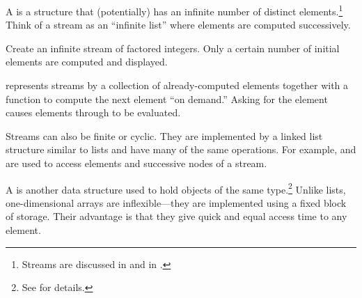 {{{{{{{{A 
is a structure that (potentially) has an infinite number of
distinct elements.\footnote{Streams are discussed in
 and in .}
Think of a stream as an ``infinite list'' where elements are
computed successively.

\begin{xtc}
\begin{xtccomment}
Create an infinite stream of factored integers.
Only a certain number of initial elements are computed
and displayed.
\end{xtccomment}
\begin{spadsrc}
\end{spadsrc}
\begin{TeXOutput}
\begin{fricasmath}{6}
%
\end{fricasmath}
\end{TeXOutput}
\end{xtc}
\begin{xtc}
\begin{xtccomment}
\Language{} represents streams by a collection of already-computed
elements together with a function to compute the next element
``on demand.''
Asking for the  element causes elements  through
 to be evaluated.
\end{xtccomment}
\begin{spadsrc}
\end{spadsrc}
\begin{TeXOutput}
\begin{fricasmath}{7}
\TIMES {}%
\end{fricasmath}
\end{TeXOutput}
\end{xtc}

Streams can also be finite or cyclic.
They are implemented by a linked list structure similar to lists
and have many of the same operations.
For example,  and  are used to access
elements and successive nodes of a stream.

A  is another data structure used
to hold objects of the same type.\footnote{See  for
details.}
Unlike lists, one-dimensional arrays are inflexible---they are
implemented using a fixed block of storage.
Their advantage is that they give quick and equal access time to
any element.

}}}}}}}}
